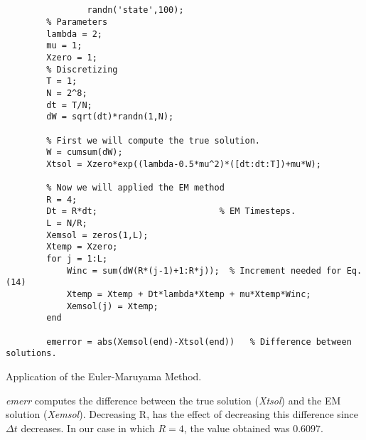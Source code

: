 \documentclass[12pt,a4paper]{article}
\begin{document}
\begin{program}
\begin{scriptsize}
				\begin{verbatim}
				
				
 				randn('state',100);
        % Parameters
        lambda = 2; 
        mu = 1; 
        Xzero = 1;    
        % Discretizing
        T = 1; 
        N = 2^8; 
        dt = T/N;         
        dW = sqrt(dt)*randn(1,N);         
        
        % First we will compute the true solution.
        W = cumsum(dW);                    
        Xtsol = Xzero*exp((lambda-0.5*mu^2)*([dt:dt:T])+mu*W); 

        % Now we will applied the EM method 
        R = 4; 
        Dt = R*dt;                        % EM Timesteps.
        L = N/R;                         
        Xemsol = zeros(1,L);                 
        Xtemp = Xzero;
        for j = 1:L;
            Winc = sum(dW(R*(j-1)+1:R*j));  % Increment needed for Eq. (14)
            Xtemp = Xtemp + Dt*lambda*Xtemp + mu*Xtemp*Winc;
            Xemsol(j) = Xtemp;
        end
        
        emerror = abs(Xemsol(end)-Xtsol(end))   % Difference between solutions.
          \end{verbatim}
\end{scriptsize}
  \caption{Application of the Euler-Maruyama Method.}
 \end{program}
\noindent \textsl{emerr} computes the difference between the true solution (\textsl{Xtsol}) and the EM solution (\textsl{Xemsol}). Decreasing R, has the effect of decreasing this difference since $\Delta t$ decreases. In our case in which $R=4$, the value obtained was $0.6097$. 
\end{document}
